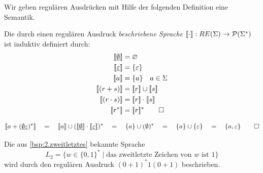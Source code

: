 \medskip

Wir geben regulären Ausdrücken mit Hilfe der folgenden Definition eine Semantik.
\begin{Def}[name={[Semantik eines regulären Ausdrucks]}]
        Die durch einen regulären Ausdruck \emph{beschriebene Sprache} $\llbracket\cdot \rrbracket : RE(\Sigma) \-> \mathcal{P}(\Sigma^*)$ ist induktiv definiert durch:
        \begin{align*}
                \llbracket \0 \rrbracket &= \varnothing\\
                \llbracket \1 \rrbracket &= \{\Eps\}\\
                \llbracket a \rrbracket &= \{a\} \quad a\in\Sigma\\
                \llbracket (r+s) \rrbracket &= \llbracket r\rrbracket \cup \llbracket s\rrbracket\\
                \llbracket (r\cdot s) \rrbracket &= \llbracket r\rrbracket \cdot \llbracket s\rrbracket\\
                \llbracket r^* \rrbracket &= \llbracket r\rrbracket^*
                \qedhere
        \end{align*}
\end{Def}
\begin{Bsp}
$$
\llbracket a + (\0\1)^*\rrbracket
\quad=\quad \llbracket a\rrbracket \cup (\llbracket \0\rrbracket \cdot \llbracket \1\rrbracket)^*
\quad=\quad \{ a\} \cup (\emptyset)^*
\quad=\quad \{ a\} \cup \{\varepsilon\}
\quad=\quad \{ a, \varepsilon\}
\qedhere
$$
\end{Bsp}
\begin{Bsp}
Die aus \autoref{bsp:2.zweitletztes} bekannte Sprache 
$$L_2=\{w\in\{0,1\}^*\mid \text{das zweitletzte Zeichen von $w$ ist $1$}\}$$
wird durch den regulären Ausdruck $(0+1)^*1(0+1)$ beschrieben.
\end{Bsp}


